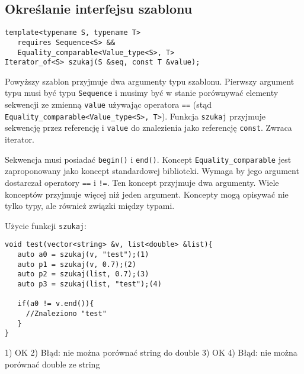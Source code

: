 \documentclass[11pt, a4paper]{article}
\begin{document}
\lstset{language=C++}

\subsection{Określanie interfejsu szablonu}

\begin{lstlisting}[frame=single]
template<typename S, typename T>
   requires Sequence<S> && 
   Equality_comparable<Value_type<S>, T>
Iterator_of<S> szukaj(S &seq, const T &value);
\end{lstlisting}

Powyższy szablon przyjmuje dwa argumenty typu szablonu. Pierwszy argument typu musi być typu \verb#Sequence# i musimy być w stanie porównywać elementy sekwencji ze zmienną \verb#value# używając operatora \verb#==# (stąd \verb#Equality_comparable<Value_type<S>, T>#). Funkcja \verb#szukaj# przyjmuje sekwencję przez referencję i \verb#value# do znalezienia jako referencję \verb#const#. Zwraca iterator.

Sekwencja musi posiadać \verb#begin()# i \verb#end()#. Koncept \verb#Equality_comparable# jest zaproponowany jako koncept standardowej biblioteki. Wymaga by jego argument dostarczał operatory \verb#==# i \verb#!=#. Ten koncept przyjmuje dwa argumenty. Wiele konceptów przyjmuje więcej niż jeden argument. Koncepty mogą opisywać nie tylko typy, ale również związki między typami. \newline

Użycie funkcji \verb#szukaj#: \newline

\begin{lstlisting}[frame=single]
void test(vector<string> &v, list<double> &list){
   auto a0 = szukaj(v, "test");(1)
   auto p1 = szukaj(v, 0.7);(2)
   auto p2 = szukaj(list, 0.7);(3)
   auto p3 = szukaj(list, "test");(4)
   
   if(a0 != v.end()){
     //Znaleziono "test"
   }
}
\end{lstlisting}

1) OK
2) Błąd: nie można porównać string do double
3) OK
4) Błąd: nie można porównać double ze string
\end{document}
